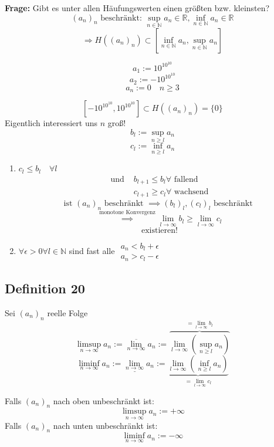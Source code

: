 \documentclass[fleqn]{scrbook}
\newenvironment{example}{{\bfseries Beispiel }}{}
\begin{document}
\textbf{Frage:} Gibt es unter allen Häufungswerten einen größten bzw. kleinsten?
\[(a_n)_n \text{ beschränkt: } \sup_{n \in \mathbb{N}} a_n \in \mathbb{R}, \inf_{n \in \mathbb{N}} a_n \in \mathbb{R} \]
\[\Longrightarrow H((a_n)_n) \subset \left[\inf_{n \in \mathbb{N}} a_n,\sup_{n \in \mathbb{N}} a_n \right] \]

\begin{example}
\[a_1:= 10^{10^{10}}\]
\[a_2:= -10^{10^{10}}\]
\[a_n:= 0 \quad n\geq 3\]

\[\left[ -10^{10^{10}}, 10^{10^{10}} \right] \subset H((a_n)_n)=\{0\}\]
Eigentlich interessiert uns $n$ groß!
\end{example}
\[ b_l := \sup_{n \geq l} a_n \]
\[ c_l := \inf_{n \geq l} a_n \]

\begin{enumerate}
 \item $\boxed{c_l \leq b_l \quad \forall l} $
   \[
     \begin{array}{ll}
       \text{und } & b_{l+1} \leq b_l \forall \text{ fallend} \\
                    & c_{l+1} \geq c_l \forall \text{ wachsend} 
     \end{array}
   \]
   \[\text{ist } (a_n)_n \text{ beschränkt } \implies (b_l)_l, (c_l)_l \text{ beschränkt }\]
   \[\stackrel{\text{monotone Konvergenz}}{\implies} \lim_{l\to \infty} b_l \geq \lim_{l \to \infty} c_l\]
   \[\text{existieren!}\]
 \item $ \forall \epsilon > 0 \forall l \in \mathbb{N} $ sind fast alle $\begin{array}{c}a_n<b_l+\epsilon \\ a_n > c_l -\epsilon \end{array}$
\end{enumerate}

\subsection{Definition 20}

Sei $(a_n)_n$ reelle Folge 
\[\limsup_{n \to \infty} a_n:= \overline{\lim_{n \to \infty}} a_n:= \overbrace{\lim_{l \to \infty} \left(\sup_{n \geq l} a_n\right)}^{=\lim_{l \to \infty} b_l}\]
\[\liminf_{n \to \infty} a_n:= \underline{\lim_{n \to \infty}} a_n:= \underbrace{\lim_{l \to \infty} \left(\inf_{n \geq l} a_n\right)}_{=\lim_{l \to \infty} c_l}\]

Falls $(a_n)_n$ nach oben unbeschränkt ist:
\[\limsup_{n \to \infty} a_n:= +\infty\]
Falls $(a_n)_n$ nach unten unbeschränkt ist:
\[\liminf_{n \to \infty} a_n:= -\infty\]
\end{document}
